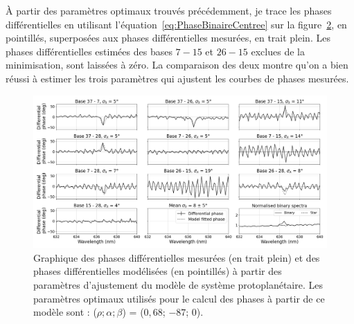 \begin{figure}[ht!]
    \label{fig:PhaseDiffBin01LikeliMap}
\end{figure}

À partir des paramètres optimaux trouvés précédemment, je trace les phases différentielles en utilisant l'équation~\ref{eq:PhaseBinaireCentree} sur la figure~\ref{fig:PhaseDiffBin01LikeliFit}, en pointillés, superposées aux phases différentielles mesurées, en trait plein. Les phases différentielles estimées des bases $7-15$ et $26-15$ exclues de la minimisation, sont laissées à zéro. La comparaison des deux montre qu'on a bien réussi à estimer les trois paramètres qui ajustent les courbes de phases mesurées.

\begin{figure}[ht!]
    \centering
    \includegraphics[width=\figwidth]{Figure_Chap4/20221010_Bin01_SpeDiffPhase_Calp2vm_FitLikeli_BaseSubplot_Pola1_LaTex.png}
    \caption[Graphique des phases différentielles mesurées et des phases différentielles modélisées à partir des paramètres d'ajustement du modèle de système protoplanétaire.]{Graphique des phases différentielles mesurées (en trait plein) et des phases différentielles modélisées (en pointillés) à partir des paramètres d'ajustement du modèle de système protoplanétaire. Les paramètres optimaux utilisés pour le calcul des phases à partir de ce modèle sont : ($\rho; \alpha; \beta$) = ($0,68$; $-87$; $0$).}
    \label{fig:PhaseDiffBin01LikeliFit}
\end{figure}

